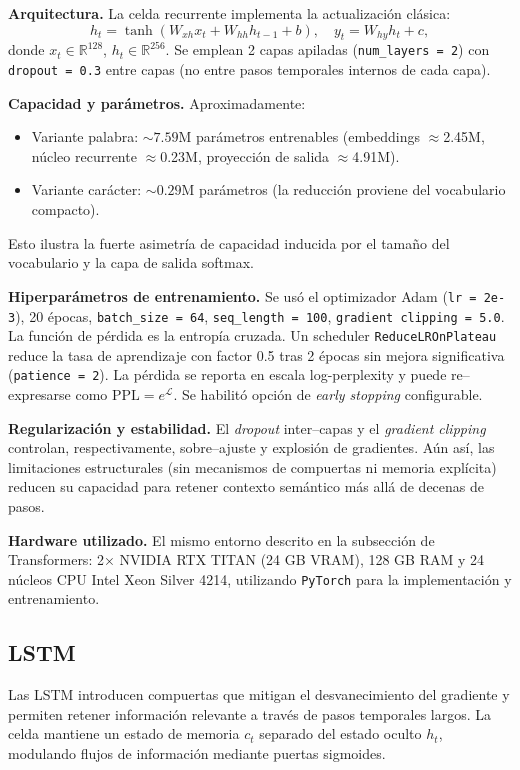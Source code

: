 \documentclass[paper=letter, fontsize=11pt, draft=false]{scrartcl}
\numberwithin{equation}{section} %
\numberwithin{figure}{section} %
\numberwithin{table}{section} %
\numberwithin{subsection}{section}
\begin{document}
	\textbf{Arquitectura.} La celda recurrente implementa la actualización clásica:
\[
h_t = \tanh(W_{xh} x_t + W_{hh} h_{t-1} + b),\quad y_t = W_{hy} h_t + c,
\]
donde $x_t \in \mathbb{R}^{128}$, $h_t \in \mathbb{R}^{256}$. Se emplean 2 capas apiladas (\texttt{num\_layers = 2}) con \texttt{dropout = 0.3} entre capas (no entre pasos temporales internos de cada capa).

\textbf{Capacidad y parámetros.} Aproximadamente:
\begin{itemize}
    \item Variante palabra: $\sim 7.59$M parámetros entrenables (embeddings $\approx$2.45M, núcleo recurrente $\approx$0.23M, proyección de salida $\approx$4.91M).
    \item Variante carácter: $\sim 0.29$M parámetros (la reducción proviene del vocabulario compacto).
\end{itemize}
Esto ilustra la fuerte asimetría de capacidad inducida por el tamaño del vocabulario y la capa de salida softmax.

	\textbf{Hiperparámetros de entrenamiento.} Se usó el optimizador Adam (\texttt{lr = 2e-3}), 20 épocas, \texttt{batch\_size = 64}, \texttt{seq\_length = 100}, \texttt{gradient clipping = 5.0}. La función de pérdida es la entropía cruzada. Un scheduler \texttt{ReduceLROnPlateau} reduce la tasa de aprendizaje con factor 0.5 tras 2 épocas sin mejora significativa (\texttt{patience = 2}). La pérdida se reporta en escala log-perplexity y puede re–expresarse como $\text{PPL} = e^{\mathcal{L}}$. Se habilitó opción de \emph{early stopping} configurable.

	\textbf{Regularización y estabilidad.} El \emph{dropout} inter–capas y el \emph{gradient clipping} controlan, respectivamente, sobre–ajuste y explosión de gradientes. Aún así, las limitaciones estructurales (sin mecanismos de compuertas ni memoria explícita) reducen su capacidad para retener contexto semántico más allá de decenas de pasos.

	\textbf{Hardware utilizado.} El mismo entorno descrito en la subsección de Transformers: 2× NVIDIA RTX TITAN (24 GB VRAM), 128 GB RAM y 24 núcleos CPU Intel Xeon Silver 4214, utilizando \texttt{PyTorch} para la implementación y entrenamiento.


\newpage
\subsection{LSTM}
Las LSTM introducen compuertas que mitigan el desvanecimiento del gradiente y permiten retener información relevante a través de pasos temporales largos. La celda mantiene un estado de memoria $c_t$ separado del estado oculto $h_t$, modulando flujos de información mediante puertas sigmoides.
\end{document}
